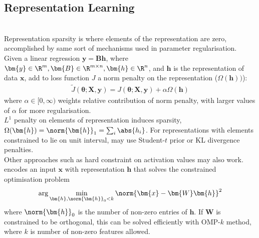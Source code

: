 \subsection{Representation Learning}

\begin{remark} \\
Representation sparsity is where elements of the representation are zero, accomplished by same sort of mechanisms used in parameter regularisation.\\
Given a linear regression $\bm{y} = \bm{B} \bm{h}$, where $\bm{y} \in \R^m, \bm{B} \in \R^{m \times n}, \bm{h} \in \R^n$, and $\bm{h}$ is the representation of data $\bm{x}$, add to loss function $J$ a norm penalty on the representation ($\Omega(\bm{h}))$):
\begin{align}
\tilde{J}(\bm{\theta}; \bm{X}, \bm{y}) = J(\bm{\theta}; \bm{X}, \bm{y}) + \alpha \Omega (\bm{h}) \nonumber
\end{align}
where $\alpha \in [0, \infty)$ weights relative contribution of norm penalty, with larger values of $\alpha$ for more regularisation.\\
$L^1$ penalty on elements of representation induces sparsity, $\Omega(\bm{h}) = \norm{\bm{h}}_1 = \sum_i \abs{h_i}$. For representations with elements constrained to lie on unit interval, may use Student-$t$ prior or KL divergence penalties.\\
Other approaches such as hard constraint on activation values may also work.  encodes an input $\bm{x}$ with representation $\bm{h}$ that solves the constrained optimisation problem
\begin{align}
\arg \min_{\bm{h}, \norm{\bm{h}}_0 < k} \norm{\bm{x} - \bm{W} \bm{h}}^2 \nonumber
\end{align}
where $\norm{\bm{h}}_0$ is the number of non-zero entries of $\bm{h}$. If $\bm{W}$ is constrained to be orthogonal, this can be solved efficiently with OMP-$k$ method, where $k$ is number of non-zero features allowed.
\end{remark}
